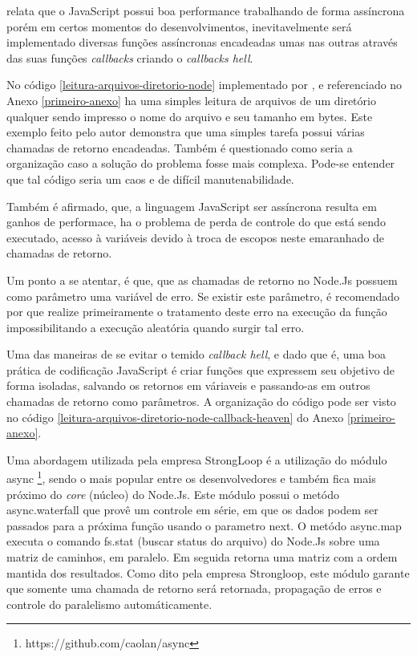   \cite{Pereira:2013} relata que o JavaScript possui boa performance trabalhando de forma assíncrona porém em certos 
  momentos do desenvolvimentos, inevitavelmente será implementado diversas funções assíncronas encadeadas umas nas 
  outras através das suas funções \textit{callbacks} criando o \textit{callbacks hell}.
  
  No código \ref{leitura-arquivos-diretorio-node} implementado por , e referenciado no Anexo \ref{primeiro-anexo}
  ha uma simples leitura de arquivos de um diretório qualquer sendo impresso o nome do arquivo e seu tamanho em
  bytes. Este exemplo feito pelo autor demonstra que uma simples tarefa possui várias chamadas de retorno encadeadas. Também
  é questionado como seria a organização caso a solução do problema fosse mais complexa. Pode-se entender que tal código
  seria um caos e de difícil manutenabilidade.
  
  Também é afirmado, que, a linguagem JavaScript ser assíncrona resulta em ganhos de 
  performace, ha o problema de perda de controle do que está sendo executado, acesso à variáveis devido à troca de escopos
  neste emaranhado de chamadas de retorno.
  
  Um ponto a se atentar, é que, que as chamadas de retorno no Node.Js possuem como parâmetro uma variável de erro. Se existir
  este parâmetro, é recomendado por  que realize primeiramente o tratamento deste erro na execução da função
  impossibilitando a execução aleatória quando surgir tal erro.
  
  Uma das maneiras de se evitar o temido \textit{callback hell}, e dado que é, uma boa prática de codificação JavaScript é
  criar funções que expressem seu objetivo de forma isoladas, salvando os retornos em váriaveis e passando-as em outros
  chamadas de retorno como parâmetros. A organização do código pode ser visto no código \ref{leitura-arquivos-diretorio-node-callback-heaven} do
  Anexo \ref{primeiro-anexo}.\cite{Pereira:2013}
 
  
  Uma abordagem utilizada pela empresa StrongLoop é a utilização do módulo async \footnote{https://github.com/caolan/async},
  sendo o mais popular entre os desenvolvedores e também fica mais próximo do \textit{core} (núcleo) do Node.Js. Este módulo
  possui o metódo async.waterfall que provê um controle em série, em que os dados podem ser passados para a próxima função
  usando o parametro next. O metódo async.map executa o comando fs.stat (buscar status do arquivo) do Node.Js sobre uma matriz
  de caminhos, em paralelo. Em seguida retorna uma matriz com a ordem mantida dos resultados. Como dito pela empresa
  Strongloop, este módulo garante que somente uma chamada de retorno será retornada, propagação de erros e controle do 
  paralelismo automáticamente. 
  

